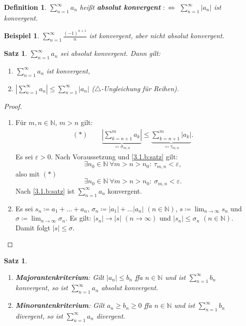 \documentclass[12pt]{extreport} %
\newcommand{\N}{\mathbb{N}}
\theoremstyle{named}
\theoremstyle{itshape}
\newtheorem{satz}[unnamedtheorem]{Satz}
\newtheorem*{definition}{Definition}
\theoremstyle{normal}
\newtheorem*{beispiel*}{Beispiel}
\begin{document}
\begin{definition}
	$\sum_{n=1}^{\infty} a_{n}$ hei{\ss}t \textbf{absolut konvergent} $:\iff$ $\sum_{n=1}^{\infty} |a_{n}|$ ist konvergent.
\end{definition}


\begin{beispiel*}
	$\sum_{n=1}^{\infty} \frac{(-1)^{n+1}}{n}$ ist konvergent, aber nicht absolut konvergent.
\end{beispiel*}


\begin{satz} \label{3.4:satz}
	$\sum_{n=1}^{\infty} a_{n}$ sei absolut konvergent. Dann gilt:
	\begin{enumerate}
		\item $\sum_{n=1}^{\infty} a_{n}$ ist konvergent,
		\item $|\sum_{n=1}^{\infty} a_{n}| \leq \sum_{n=1}^{\infty} |a_{n}|$ ($\triangle$-Ungleichung für Reihen).
	\end{enumerate}
\end{satz}

\begin{proof} ~\
	\begin{enumerate}
		\item Für $m,n \in \N$, $m > n$ gilt:
			\begin{align*}
			(\ast)	 \quad \quad \underbrace{| \sum_{k = n+1}^{m} a_{k} |}_{\eqqcolon \sigma_{m, n}} \leq \underbrace{\sum_{k = n+1}^{m}|a_{k}|}_{\eqqcolon \tau_{m, n}}.
			\end{align*}
			Es sei $\varepsilon > 0$. Nach Voraussetzung und \ref{3.1.b:satz} gilt: 
			$$
			\exists n_{0} \in \N ~ \forall m > n > n_{0}: ~ \tau_{m, n} < \varepsilon,
			$$
			also mit $(\ast)$  
			$$
			\exists n_{0} \in \N ~ \forall m > n > n_{0}: ~ \sigma_{m, n} < \varepsilon.
			$$
			Nach \ref{3.1.b:satz} ist $\sum_{n=1}^{\infty} a_{n}$ konvergent.
		\item Es sei $s_{n} \coloneqq a_{1} + \dotsc + a_{n}$, $\sigma_{n} \coloneqq |a_{1}| + \dotsc |a_{n}|$ $(n \in \N)$,		
		        $s \coloneqq \lim_{n \to \infty} s_{n}$ und $\sigma \coloneqq \lim_{n \to \infty} \sigma_{n}$. Es gilt: $|s_{n}| \rightarrow |s|$ $(n \to \infty)$ und 
			$|s_n| \leq \sigma_n$ $(n \in \N)$. Damit folgt $|s| \leq \sigma$.
	\end{enumerate}
\end{proof}

 
\begin{satz} ~\ \label{3.5:satz}
	\begin{enumerate}
		\item \textbf{Majorantenkriterium}: Gilt $|a_{n}| \leq b_{n}$ ffa $n \in \N$ und ist $\sum_{n=1}^{\infty} b_{n}$ konvergent, so ist $\sum_{n=1}^{\infty} a_{n}$ 
		absolut konvergent. \label{3.5.a:satz}
		\item \textbf{Minorantenkriterium}: Gilt $a_{n} \geq b_{n} \geq 0$ ffa $n \in \N$ und ist $\sum_{n=1}^{\infty}b_{n}$ divergent, so ist $\sum_{n=1}^{\infty} a_{n}$ 
		divergent. \label{3.5.b:satz}
	\end{enumerate}
\end{satz}
\end{document}

